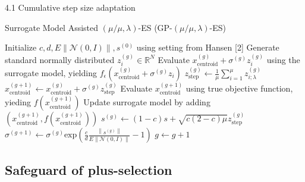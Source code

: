 \documentclass{beamer}
\begin{document}
\begin{frame}{4.1 Cumulative step size adaptation}


\begin{block}{Surrogate Model Assisted $(\mu/\mu,\lambda)$-ES (GP-$(\mu/\mu,\lambda)$-ES)}
 \footnotesize{
    \begin{algorithm}[H]
    \begin{algorithmic}[1]
        \STATE Initialize $c,d,E \left\lVert \mathcal{N}(0,I) \right\rVert,s^{(0)}$  using setting from Hansen [2]
        		\STATE Generate standard normally distributed $z_i^{(g)} \in \mathbb{R}^N $
        		\STATE Evaluate $x_{\text{centroid}}^{(g)} + \sigma^{(g)} z_i^{(g)}$ using the surrogate model, yielding $f_{\epsilon}(x_{\text{centroid}}^{(g)} + \sigma^{(g)} z_i)$
        	\ENDFOR
        	\STATE $z_{\text{step}}^{(g)} \leftarrow \frac{1}{\mu}\sum_{i=1}^{\mu} z_{i;\lambda}^{(g)}$
        	\STATE $x_{\text{centroid}}^{(g+1)} \leftarrow  x_{\text{centroid}}^{(g)} + \sigma^{(g)} z_{\text{step}}^{(g)}$ 
        	\STATE Evaluate $x_{\text{centroid}}^{(g+1)}$ using true objective function, yieding $f(x_{\text{centroid}}^{(g+1)})$
        	\STATE Update surrogate model by adding $(x_{\text{centroid}}^{(g+1)},f(x_{\text{centroid}}^{(g+1)}))$
        	\STATE $s^{(g)} \leftarrow (1-c)s + \sqrt{ c(2-c) \mu} z_{\text{step}}^{(g)}$
        	\STATE $\sigma^{(g+1)} \leftarrow \sigma^{(g)}  \text{exp} \left(\frac{c}{d} \frac{\left\lVert s^{(g)} \right\rVert} { E \left\lVert \mathcal{N}(0,I) \right\rVert} -1 \right )$
        	\STATE $g \leftarrow g + 1$
        \ENDWHILE
    \end{algorithmic}
    \end{algorithm}
}
\end{block}

\end{frame}

\subsection{Safeguard of plus-selection}
\end{document}
